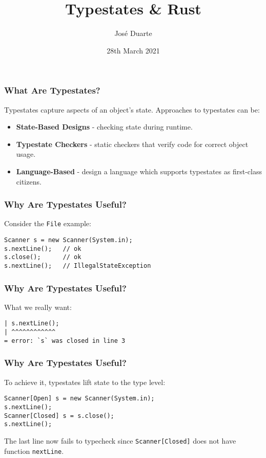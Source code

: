 \documentclass{beamer}
\title{Typestates \& Rust}
\date{28th March 2021}
\author{José Duarte}
\institute{FCT NOVA}
\begin{document}
\maketitle
\begin{frame}
    \frametitle{What Are Typestates?}
    Typestates capture aspects of an object's state.
    Approaches to typestates can be:
    \begin{itemize}
        \item \textbf{State-Based Designs} - checking state during runtime.
        \item \textbf{Typestate Checkers} - static checkers that verify code for correct object usage.
        \item \textbf{Language-Based} - design a language which supports typestates as first-class citizens. %
    \end{itemize}
\end{frame}

\begin{frame}[fragile]
    \frametitle{Why Are Typestates Useful?}
    Consider the \texttt{File} example:
    \begin{lstlisting}
Scanner s = new Scanner(System.in);
s.nextLine();   // ok
s.close();      // ok
s.nextLine();   // IllegalStateException
    \end{lstlisting}
\end{frame}

\begin{frame}[fragile]
    \frametitle{Why Are Typestates Useful?}
    What we really want:
    \begin{lstlisting}
| s.nextLine();
| ^^^^^^^^^^^^
= error: `s` was closed in line 3
    \end{lstlisting}
\end{frame}

\begin{frame}[fragile]
    \frametitle{Why Are Typestates Useful?}
    To achieve it, typestates lift state to the type level:
    \begin{lstlisting}
Scanner[Open] s = new Scanner(System.in);
s.nextLine();
Scanner[Closed] s = s.close();
s.nextLine();
    \end{lstlisting}
    The last line now fails to typecheck since \texttt{Scanner[Closed]}
    does not have function \texttt{nextLine}.
\end{frame}
\end{document}
